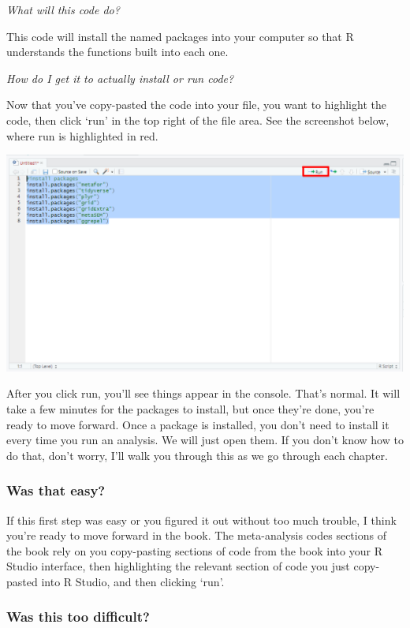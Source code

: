 \documentclass[
]{book}
\begin{document}
\emph{What will this code do?}

This code will install the named packages into your computer so that R understands the functions built into each one.

\emph{How do I get it to actually install or run code?}

Now that you've copy-pasted the code into your file, you want to highlight the code, then click `run' in the top right of the file area. See the screenshot below, where run is highlighted in red.

\includegraphics[width=1\textwidth,height=\textheight]{images/runbutton.PNG}

After you click run, you'll see things appear in the console. That's normal. It will take a few minutes for the packages to install, but once they're done, you're ready to move forward. Once a package is installed, you don't need to install it every time you run an analysis. We will just open them. If you don't know how to do that, don't worry, I'll walk you through this as we go through each chapter.

\hypertarget{was-that-easy}{%
\subsubsection{Was that easy?}\label{was-that-easy}}

If this first step was easy or you figured it out without too much trouble, I think you're ready to move forward in the book. The meta-analysis codes sections of the book rely on you copy-pasting sections of code from the book into your R Studio interface, then highlighting the relevant section of code you just copy-pasted into R Studio, and then clicking `run'.

\hypertarget{was-this-too-difficult}{%
\subsubsection{Was this too difficult?}\label{was-this-too-difficult}}
\end{document}
